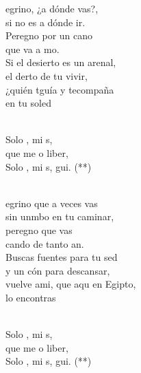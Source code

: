 \begin{cancion}%
	egrino, ¿a dónde vas?, \\
	si no es a dónde ir.\\
	Peregno por un cano \\
	que va a mo. \\
Si el desierto es un arenal, \\
	el derto de tu vivir,\\
	¿quién tguía y tecompaña \\
	en tu soled  \\\jump\\
	\begin{chorus}%
	Solo , mi s,\\
	que me o liber,\\
	Solo , mi s, gui. (**) \\
	\end{chorus}%
	\jump\\
	egrino que a veces vas \\
	sin unmbo en tu caminar,\\
	peregno que vas \\
	cando de tanto an. \\
Buscas fuentes para tu sed \\
	y un cón para descansar,\\
	vuelve ami, que aqu en Egipto, \\
	lo encontras \\\jump\\
	\begin{chorus}%
	Solo , mi s,\\
	que me o liber,\\
	Solo , mi s, gui. (**) \\
	\end{chorus}%

\end{cancion}
